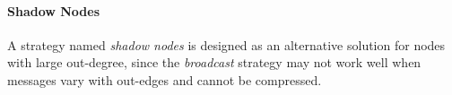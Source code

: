 \documentclass[conference]{IEEEtran}
\begin{document}






\paragraph{\textbf{Shadow Nodes}} 
A strategy named \emph{shadow nodes} is designed as an alternative solution for nodes with large out-degree, since the \emph{broadcast} strategy may not work well when messages vary with out-edges and cannot be compressed.
\end{document}
